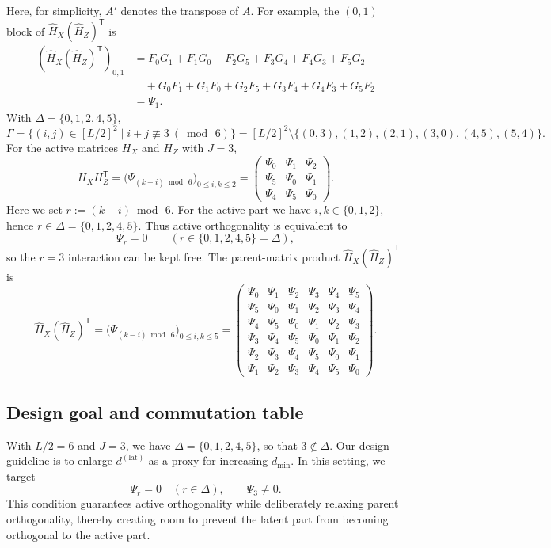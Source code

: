 \documentclass[a4paper,onecolumn,11pt,accepted=2026-08-03]{quantumarticle}
\newcommand{\Hful}{\hat{H}}
\renewcommand\[{\begin{equation}}
\renewcommand\]{\end{equation}}
\theoremstyle{definition}
\begin{document}
Here, for simplicity, $A'$ denotes the transpose of $A$.
For example, the $(0,1)$ block of $\Hful_X(\Hful_Z)^{\mathsf T}$ is
\begin{equation*}
\begin{aligned}
(\Hful_X(\Hful_Z)^{\mathsf T})_{0,1}
&= F_0G_1+F_1G_0+F_2G_5+F_3G_4+F_4G_3+F_5G_2 \\
&\quad +G_0F_1+G_1F_0+G_2F_5+G_3F_4+G_4F_3+G_5F_2 \\
&= \Psi_1.
\end{aligned}
\end{equation*}
With $\Delta=\{0,1,2,4,5\}$,
\[
\Gamma=\{(i,j)\in[L/2]^2\mid i+j\not\equiv 3\ (\bmod\, 6)\}
=[L/2]^2\setminus\{(0,3),(1,2),(2,1),(3,0),(4,5),(5,4)\}.
\]
For the active matrices $H_X$ and $H_Z$ with $J=3$,
\begin{equation*}
H_XH_Z^{\mathsf T}
=
\bigl(\Psi_{(k-i)\bmod\, 6}\bigr)_{0\le i,k\le 2}
=
\begin{pmatrix}
\Psi_0 & \Psi_1 & \Psi_2\\
\Psi_5 & \Psi_0 & \Psi_1\\
\Psi_4 & \Psi_5 & \Psi_0
\end{pmatrix}.
\end{equation*}
Here we set $r:=(k-i)\bmod\,6$. For the active part we have $i,k\in\{0,1,2\}$, hence
$r\in\Delta=\{0,1,2,4,5\}$.
Thus active orthogonality is equivalent to
\begin{equation*}
\Psi_r=0\qquad(r\in\{0,1,2,4,5\}=\Delta),
\end{equation*}
so the $r=3$ interaction can be kept free. The parent-matrix product $\Hful_X(\Hful_Z)^{\mathsf T}$ is
\begin{equation*}
\Hful_X(\Hful_Z)^{\mathsf T}
=
\bigl(\Psi_{(k-i)\bmod\, 6}\bigr)_{0\le i,k\le 5}
=
\left(
\begin{array}{lll|lll}
\Psi_0 & \Psi_1 & \Psi_2 & \Psi_3 & \Psi_4 & \Psi_5\\
\Psi_5 & \Psi_0 & \Psi_1 & \Psi_2 & \Psi_3 & \Psi_4\\
\Psi_4 & \Psi_5 & \Psi_0 & \Psi_1 & \Psi_2 & \Psi_3\\ \hline
\Psi_3 & \Psi_4 & \Psi_5 & \Psi_0 & \Psi_1 & \Psi_2\\
\Psi_2 & \Psi_3 & \Psi_4 & \Psi_5 & \Psi_0 & \Psi_1\\
\Psi_1 & \Psi_2 & \Psi_3 & \Psi_4 & \Psi_5 & \Psi_0
\end{array}
\right).
\end{equation*}


\subsection{Design goal and commutation table}
With $L/2=6$ and $J=3$, we have $\Delta=\{0,1,2,4,5\}$, so that $3\notin\Delta$.
Our design guideline is to enlarge $d^{(\mathrm{lat})}$ as a proxy for increasing $d_{\min}$. In this setting, we target
\[
\Psi_r=0\quad (r\in\Delta), \qquad \Psi_3\neq 0.
\]
This condition guarantees active orthogonality while deliberately relaxing parent orthogonality,
thereby creating room to prevent the latent part from becoming orthogonal to the active part.
\end{document}
